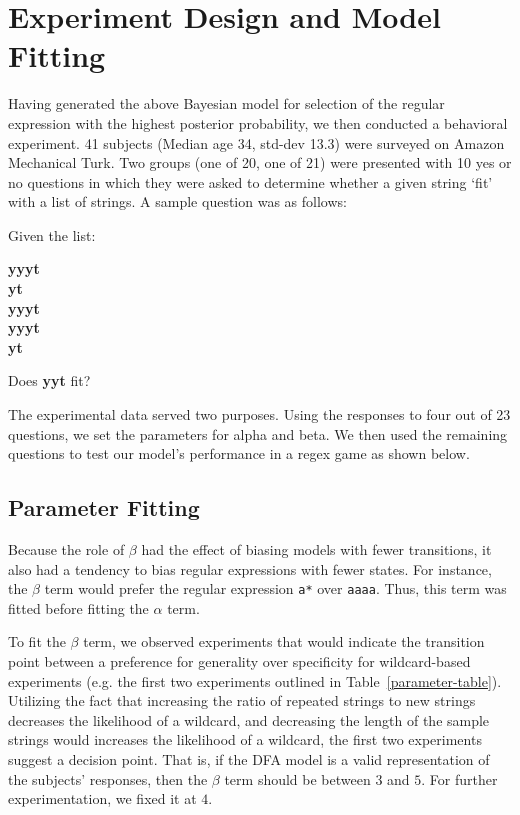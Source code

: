 \documentclass[10pt,letterpaper]{article}
\begin{document}
\section{Experiment Design and Model Fitting}
Having generated the above Bayesian model for selection of the regular expression with the highest posterior probability, we then conducted a behavioral experiment.  41 subjects (Median age 34, std-dev 13.3) were surveyed on Amazon Mechanical Turk. Two groups (one of 20, one of 21) were presented with 10 yes or no questions in which they were asked to determine whether a given string `fit' with a list of strings. A sample question was as follows: \\
\begin{center}Given the list:

\textbf{yyyt \\
yt \\
yyyt \\
yyyt \\ 
yt}

Does \textbf{yyt} fit?
\end{center}

The experimental data served two purposes. Using the responses to four out of 23 questions, we set the parameters for alpha and beta. We then used the remaining questions to test our model's performance in a regex game as shown below. 

\subsection{Parameter Fitting}
Because the role of $\beta$ had the effect of biasing models with fewer transitions, it also had a tendency to bias regular expressions with fewer states. For instance, the $\beta$ term would prefer the regular expression \verb!a*! over \verb!aaaa!. Thus, this term was fitted before fitting the $\alpha$ term.

To fit the $\beta$ term, we observed experiments that would indicate the transition point between a preference for generality over specificity for wildcard-based experiments (e.g. the first two experiments outlined in Table~\ref{parameter-table}). Utilizing the fact that increasing the ratio of repeated strings to new strings decreases the likelihood of a wildcard, and decreasing the length of the sample strings would increases the likelihood of a wildcard, the first two experiments suggest a decision point. That is, if the DFA model is a valid representation of the subjects' responses, then the $\beta$ term should be between $3$ and $5$. For further experimentation, we fixed it at $4$.
\end{document}
